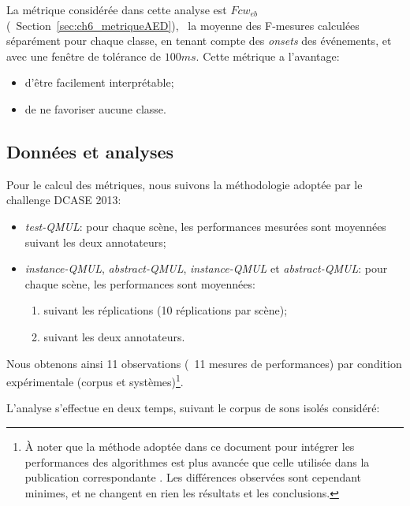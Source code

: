 La métrique considérée dans cette analyse est $Fcw_{eb}$ (\cf~Section~\ref{sec:ch6_metriqueAED}), \ie~la moyenne des F-mesures calculées séparément pour chaque classe, en tenant compte des \emph{onsets} des événements, et avec une fenêtre de tolérance de $100ms$. Cette métrique a l'avantage: 

\begin{itemize}
\item d'être facilement interprétable;
\item de ne favoriser aucune classe.
\end{itemize}

\subsection{Données et analyses}

Pour le calcul des métriques, nous suivons la méthodologie adoptée par le challenge DCASE 2013:

\begin{itemize}

\item \emph{test-QMUL}: pour chaque scène, les performances mesurées sont moyennées suivant les deux annotateurs;
\item  \emph{instance-QMUL}, \emph{abstract-QMUL},  \emph{instance-QMUL} et \emph{abstract-QMUL}: pour chaque scène, les performances sont moyennées:

\begin{enumerate}
\item suivant les réplications (10 réplications par scène);
\item suivant les deux annotateurs.
\end{enumerate}

\end{itemize}

Nous obtenons ainsi 11 observations (\ie~11 mesures de performances) par condition expérimentale (corpus et systèmes)\footnote{À noter que la méthode adoptée dans ce document pour intégrer les performances des algorithmes est plus avancée que celle utilisée dans la publication correspondante \citep{lafay2016morphological}. Les différences observées sont cependant minimes, et ne changent en rien les résultats et les conclusions.}.

L'analyse s'effectue en deux temps, suivant le corpus de sons isolés considéré:

